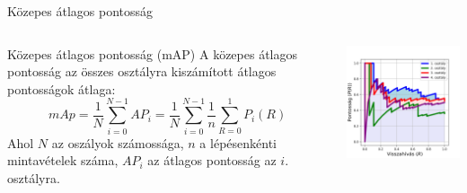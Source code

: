 \documentclass[english, aspectratio=169]{beamer}
\begin{document}
\begin{frame}{Közepes átlagos pontosság}
\begin{columns}
\begin{column}{.5\textwidth}
\begin{block}{Közepes átlagos pontosság (mAP)}
A közepes átlagos pontosság az összes osztályra kiszámított átlagos pontosságok átlaga:
\[
mAp = \frac{1}{N} \sum_{i=0}^{N-1} AP_i = \frac{1}{N} \sum_{i=0}^{N-1} \frac{1}{n} \sum_{R=0}^1 P_i(R)
\]
Ahol $N$ az oszályok számossága, $n$ a lépésenkénti mintavételek száma, $AP_i$ az átlagos pontosság  az $i$. osztályra.
\end{block}
\end{column}
\begin{column}{.5\textwidth}
\begin{center}
\includegraphics[width=7cm, keepaspectratio]{images/od_13.png}
\end{center}
\end{column}
\end{columns}
\end{frame}
\end{document}
